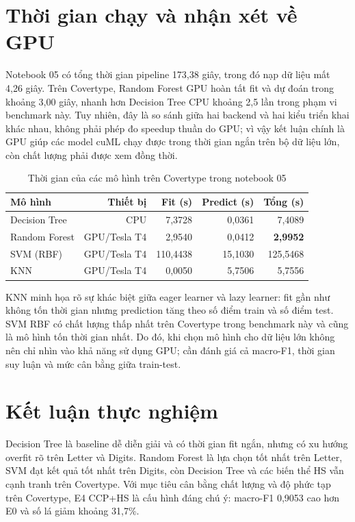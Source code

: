 \section{Thời gian chạy và nhận xét về GPU}

Notebook 05 có tổng thời gian pipeline 173,38 giây, trong đó nạp dữ liệu mất 4,26 giây.
Trên Covertype, Random Forest GPU hoàn tất fit và dự đoán trong khoảng 3,00 giây, nhanh
hơn Decision Tree CPU khoảng 2,5 lần trong phạm vi benchmark này. Tuy nhiên, đây là so
sánh giữa hai backend và hai kiểu triển khai khác nhau, không phải phép đo speedup thuần
do GPU; vì vậy kết luận chính là GPU giúp các model cuML chạy được trong thời gian ngắn
trên bộ dữ liệu lớn, còn chất lượng phải được xem đồng thời.

\begin{table}[H]
    \centering
    \caption{Thời gian của các mô hình trên Covertype trong notebook 05}
    \label{tab:covertype-runtime}
    \small
    \begin{tabular}{@{}lrrrr@{}}
        \toprule
        \textbf{Mô hình} & \textbf{Thiết bị} & \textbf{Fit (s)} & \textbf{Predict (s)} & \textbf{Tổng (s)} \\
        \midrule
        Decision Tree & CPU & 7,3728 & 0,0361 & 7,4089 \\
        Random Forest & GPU/Tesla T4 & 2,9540 & 0,0412 & \textbf{2,9952} \\
        SVM (RBF) & GPU/Tesla T4 & 110,4438 & 15,1030 & 125,5468 \\
        KNN & GPU/Tesla T4 & 0,0050 & 5,7506 & 5,7556 \\
        \bottomrule
    \end{tabular}
\end{table}

KNN minh họa rõ sự khác biệt giữa eager learner và lazy learner: fit gần như không tốn
thời gian nhưng prediction tăng theo số điểm train và số điểm test. SVM RBF có chất lượng
thấp nhất trên Covertype trong benchmark này và cũng là mô hình tốn thời gian nhất. Do
đó, khi chọn mô hình cho dữ liệu lớn không nên chỉ nhìn vào khả năng sử dụng GPU; cần
đánh giá cả macro-F1, thời gian suy luận và mức cân bằng giữa train-test.

\section{Kết luận thực nghiệm}

Decision Tree là baseline dễ diễn giải và có thời gian fit ngắn, nhưng có xu hướng
overfit rõ trên Letter và Digits. Random Forest là lựa chọn tốt nhất trên Letter, SVM
đạt kết quả tốt nhất trên Digits, còn Decision Tree và các biến thể HS vẫn cạnh tranh
trên Covertype. Với mục tiêu cân bằng chất lượng và độ phức tạp trên Covertype, E4
CCP+HS là cấu hình đáng chú ý: macro-F1 0,9053 cao hơn E0 và số lá giảm khoảng 31,7\%.

